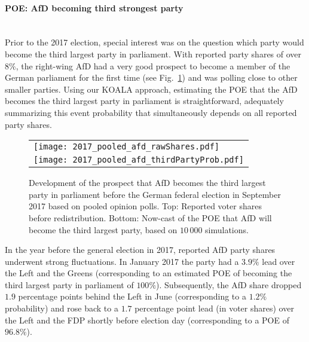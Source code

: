 \documentclass[smallextended]{svjour3}      %
\begin{document}
\paragraph{POE: AfD becoming third strongest party} \ \\
Prior to the 2017 election, special interest was on the question
which party would become the third largest party in parliament.
With reported party shares of over $8\%$, the right-wing AfD had a very good
prospect to become a member of the German parliament for the first time
(see Fig.~\ref{fig:2017_afd}) and was polling close to other smaller parties.
Using our KOALA approach, estimating the POE that the AfD becomes
the third largest party in parliament is straightforward, adequately summarizing
this event probability that simultaneously depends on all reported party shares.

\begin{figure}[H]\centering
\begin{tabular}{l}
\texttt{[image: 2017\_pooled\_afd\_rawShares.pdf]}
\\
\texttt{[image: 2017\_pooled\_afd\_thirdPartyProb.pdf]}
\end{tabular}
\caption{Development of the prospect that AfD becomes the third largest party
in parliament before the German federal election in September 2017 based on pooled
opinion polls.
Top: Reported voter shares before redistribution.
Bottom: Now-cast of the POE that AfD will become the third largest party,
based on $10\,000$ simulations.
\label{fig:2017_afd}
}
\end{figure}

In the year before the general election in 2017, reported AfD party shares
underwent strong fluctuations. In January 2017 the party had a $3.9\%$ lead
over the Left and the Greens (corresponding to an estimated POE of
becoming the third largest party in parliament of $100\%$). Subsequently, the
AfD share dropped $1.9$ percentage points behind the Left in June
(corresponding to a $1.2\%$ probability)
and rose back to a $1.7$ percentage point lead (in voter shares) over the Left
and the FDP shortly before election day (corresponding to a POE of $96.8\%$).
\end{document}

